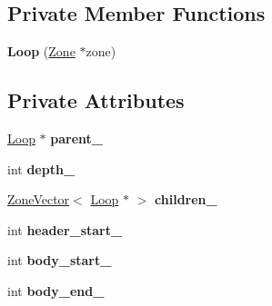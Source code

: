 \subsection*{Private Member Functions}
\begin{DoxyCompactItemize}
\item 
{\bfseries Loop} (\hyperlink{classv8_1_1internal_1_1_zone}{Zone} $\ast$zone)\hypertarget{classv8_1_1internal_1_1compiler_1_1_loop_tree_1_1_loop_a7dcb4f6409c02d8e735d81858df3b0e3}{}\label{classv8_1_1internal_1_1compiler_1_1_loop_tree_1_1_loop_a7dcb4f6409c02d8e735d81858df3b0e3}

\end{DoxyCompactItemize}
\subsection*{Private Attributes}
\begin{DoxyCompactItemize}
\item 
\hyperlink{classv8_1_1internal_1_1compiler_1_1_loop_tree_1_1_loop}{Loop} $\ast$ {\bfseries parent\+\_\+}\hypertarget{classv8_1_1internal_1_1compiler_1_1_loop_tree_1_1_loop_a7985cc27a8d6f723ac796dc625f3b9c8}{}\label{classv8_1_1internal_1_1compiler_1_1_loop_tree_1_1_loop_a7985cc27a8d6f723ac796dc625f3b9c8}

\item 
int {\bfseries depth\+\_\+}\hypertarget{classv8_1_1internal_1_1compiler_1_1_loop_tree_1_1_loop_a7db2f77661ebb4d2e207187a92a50476}{}\label{classv8_1_1internal_1_1compiler_1_1_loop_tree_1_1_loop_a7db2f77661ebb4d2e207187a92a50476}

\item 
\hyperlink{classv8_1_1internal_1_1_zone_vector}{Zone\+Vector}$<$ \hyperlink{classv8_1_1internal_1_1compiler_1_1_loop_tree_1_1_loop}{Loop} $\ast$ $>$ {\bfseries children\+\_\+}\hypertarget{classv8_1_1internal_1_1compiler_1_1_loop_tree_1_1_loop_a2291ff58ed427d19841b46bcf4baa166}{}\label{classv8_1_1internal_1_1compiler_1_1_loop_tree_1_1_loop_a2291ff58ed427d19841b46bcf4baa166}

\item 
int {\bfseries header\+\_\+start\+\_\+}\hypertarget{classv8_1_1internal_1_1compiler_1_1_loop_tree_1_1_loop_a8b32b26170dfaae05398e506975f99ce}{}\label{classv8_1_1internal_1_1compiler_1_1_loop_tree_1_1_loop_a8b32b26170dfaae05398e506975f99ce}

\item 
int {\bfseries body\+\_\+start\+\_\+}\hypertarget{classv8_1_1internal_1_1compiler_1_1_loop_tree_1_1_loop_a659839f82712e43d9c801c177682a54c}{}\label{classv8_1_1internal_1_1compiler_1_1_loop_tree_1_1_loop_a659839f82712e43d9c801c177682a54c}

\item 
int {\bfseries body\+\_\+end\+\_\+}\hypertarget{classv8_1_1internal_1_1compiler_1_1_loop_tree_1_1_loop_aeb2babca52bfa7403bdad8dff67d3c27}{}\label{classv8_1_1internal_1_1compiler_1_1_loop_tree_1_1_loop_aeb2babca52bfa7403bdad8dff67d3c27}

\end{DoxyCompactItemize}
